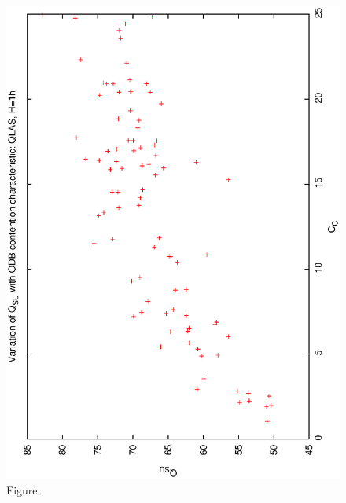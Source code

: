 \documentclass[12pt,a4paper]{article}
\begin{document}
\begin{figure}[htbp]
 \begin{center}
  \includegraphics[scale=1.0, angle=0]{figures/qsucc_ql1.eps}
 \end{center}
  \caption[Figure.]
{Figure.}
\end{figure}
\clearpage
\end{document}
